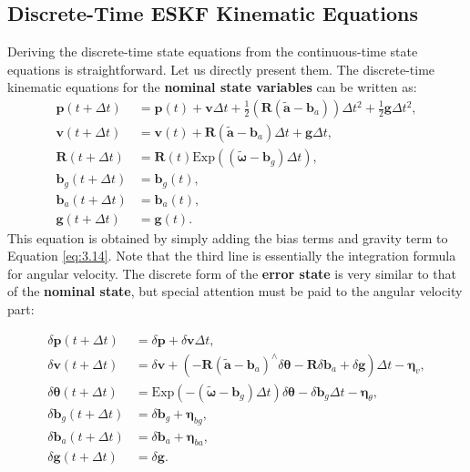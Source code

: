 \subsection{Discrete-Time ESKF Kinematic Equations}  
Deriving the discrete-time state equations from the continuous-time state equations is straightforward. Let us directly present them. The discrete-time kinematic equations for the \textbf{nominal state variables} can be written as:  
\begin{subequations}\label{key}  
	\begin{align}  
		\bm{p}(t+\Delta t) &= \bm{p}(t) + \bm{v} \Delta t + \frac{1}{2}   
		\left(\bm{R}(\tilde{\bm{a}}-\bm{b}_a) \right) \Delta t^2 + \frac{1}{2} \bm{g} \Delta t^2, \\  
		\bm{v}(t+\Delta t) &= \bm{v}(t) + \bm{R} (\tilde{\bm{a}} - \bm{b}_a) \Delta t + \bm{g} \Delta t,	\\  
		\bm{R}(t+\Delta t) &= \bm{R}(t) \mathrm{Exp} \left( (\tilde{\boldsymbol{\omega}}-\bm{b}_g)   
		\Delta t \right),\\  
		\bm{b}_g(t+\Delta t) &= \bm{b}_g(t), \\  
		\bm{b}_a(t+\Delta t) &= \bm{b}_a(t), \\  
		\bm{g}(t+\Delta t) &= \bm{g}(t) .  
	\end{align}  
\end{subequations}  
This equation is obtained by simply adding the bias terms and gravity term to Equation \eqref{eq:3.14}. Note that the third line is essentially the integration formula for angular velocity. The discrete form of the \textbf{error state} is very similar to that of the \textbf{nominal state}, but special attention must be paid to the angular velocity part:  

\begin{subequations}\label{eq:eskf-motion-equation}  
	\begin{align}  
		\delta \bm{p}(t+\Delta t) &= \delta \bm{p} + \delta \bm{v} \Delta t, \\  
		\delta \bm{v}(t+\Delta t) &= \delta \bm{v} + \left( - \bm{R}(\tilde{\bm{a}} - \bm{b}_a)^\wedge   
		\delta \boldsymbol{\theta} - \bm{R} \delta \bm{b}_a  + \delta \bm{g} \right) \Delta t -  
		\boldsymbol{\eta}_{v}, \\  
		\delta \boldsymbol{\theta} (t+\Delta t) &= \mathrm{Exp}\left( -(\tilde{\boldsymbol{\omega}} -   
		\bm{b}_g) \Delta t \right) \delta \boldsymbol{\theta} - \delta \bm{b}_g \Delta t -   
		\boldsymbol{\eta}_{\theta}, \\  
		\delta \bm{b}_g (t+\Delta t) &= \delta \bm{b}_g + \boldsymbol{\eta}_{bg}, \\  
		\delta \bm{b}_a (t+\Delta t)&= \delta \bm{b}_a + \boldsymbol{\eta}_{ba}, \\  
		\delta \bm{g} (t+\Delta t) &= \delta \bm{g}.  
	\end{align}  
\end{subequations}  

